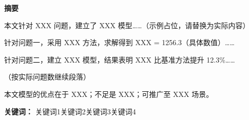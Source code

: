%
%

\thispagestyle{empty}

\begin{center}
  {\Large\bfseries\heiti 摘\quad 要}
\end{center}
\vspace{1em}

%

本文针对 XXX 问题，建立了 XXX 模型……（示例占位，请替换为实际内容）

针对问题一，采用 XXX 方法，求解得到 XXX = 1256.3（具体数值）……

针对问题二，建立 XXX 模型，结果表明 XXX 比基准方法提升 12.3\%……

（按实际问题数继续段落）

本文模型的优点在于 XXX；不足是 XXX；可推广至 XXX 场景。

\vfill

\noindent\textbf{关键词：} 关键词1\quad 关键词2\quad 关键词3\quad 关键词4
